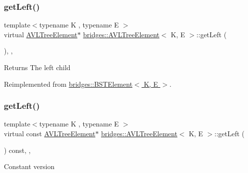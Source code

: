\subsubsection{\texorpdfstring{get\+Left()}{getLeft()}\hspace{0.1cm}{\footnotesize\ttfamily [1/2]}}
{\footnotesize\ttfamily template$<$typename K , typename E $>$ \\
virtual \hyperlink{classbridges_1_1_a_v_l_tree_element}{A\+V\+L\+Tree\+Element}$\ast$ \hyperlink{classbridges_1_1_a_v_l_tree_element}{bridges\+::\+A\+V\+L\+Tree\+Element}$<$ K, E $>$\+::get\+Left (\begin{DoxyParamCaption}{ }\end{DoxyParamCaption})\hspace{0.3cm}{\ttfamily [inline]}, {\ttfamily [override]}, {\ttfamily [virtual]}}

\begin{DoxyReturn}{Returns}
The left child 
\end{DoxyReturn}


Reimplemented from \hyperlink{classbridges_1_1_b_s_t_element_a4d8987373c75b51fca94e3c0b78b87a6}{bridges\+::\+B\+S\+T\+Element$<$ K, E $>$}.

\hypertarget{classbridges_1_1_a_v_l_tree_element_a61e075db5414b7bd6f52d657401acda3}{}\label{classbridges_1_1_a_v_l_tree_element_a61e075db5414b7bd6f52d657401acda3} 
\subsubsection{\texorpdfstring{get\+Left()}{getLeft()}\hspace{0.1cm}{\footnotesize\ttfamily [2/2]}}
{\footnotesize\ttfamily template$<$typename K , typename E $>$ \\
virtual const \hyperlink{classbridges_1_1_a_v_l_tree_element}{A\+V\+L\+Tree\+Element}$\ast$ \hyperlink{classbridges_1_1_a_v_l_tree_element}{bridges\+::\+A\+V\+L\+Tree\+Element}$<$ K, E $>$\+::get\+Left (\begin{DoxyParamCaption}{ }\end{DoxyParamCaption}) const\hspace{0.3cm}{\ttfamily [inline]}, {\ttfamily [override]}, {\ttfamily [virtual]}}

Constant version

